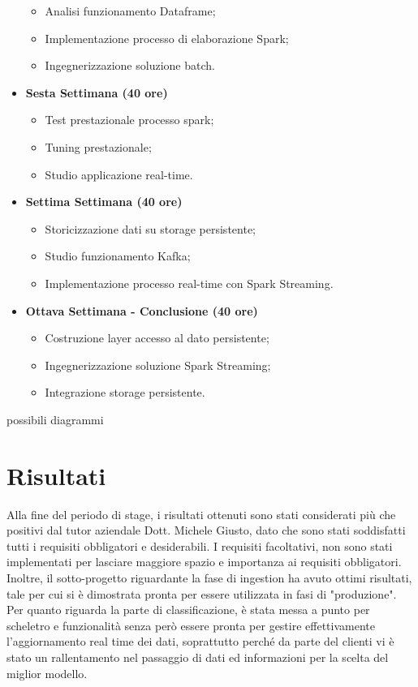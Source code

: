 \begin{itemize}
\begin{itemize}
		\item Analisi funzionamento Dataframe;
		\item Implementazione processo di elaborazione Spark;
		\item Ingegnerizzazione soluzione batch.
	\end{itemize}
	\item[] \textbf{Sesta Settimana (40 ore)} 
	\begin{itemize}
		\item Test prestazionale processo spark;
		\item Tuning prestazionale;
		\item Studio applicazione real-time.
	\end{itemize}
	\item[] \textbf{Settima Settimana (40 ore)} 
	\begin{itemize}
		\item Storicizzazione dati su storage persistente;
		\item Studio funzionamento Kafka;
		\item Implementazione processo real-time con Spark Streaming.
	\end{itemize}
	\item[] \textbf{Ottava Settimana - Conclusione (40 ore)} 
	\begin{itemize}
		\item Costruzione layer accesso al dato persistente;
		\item Ingegnerizzazione soluzione Spark Streaming;
		\item Integrazione storage persistente.
	\end{itemize}
\end{itemize}
possibili diagrammi
\section{Risultati}
Alla fine del periodo di stage, i risultati ottenuti sono stati considerati più che positivi dal tutor aziendale Dott. Michele Giusto, dato che sono stati soddisfatti tutti i requisiti obbligatori e desiderabili. I requisiti facoltativi, non sono stati implementati per lasciare maggiore spazio e importanza ai requisiti obbligatori.
\\
Inoltre, il sotto-progetto riguardante la fase di ingestion ha avuto ottimi risultati, tale per cui si è dimostrata pronta per essere utilizzata in fasi di "produzione".
Per quanto riguarda la parte di classificazione, è stata messa a punto per scheletro e funzionalità senza però essere pronta per gestire effettivamente l'aggiornamento real time dei dati, soprattutto perché da parte del clienti vi è stato un rallentamento nel passaggio di dati ed informazioni per la scelta del miglior modello. 


